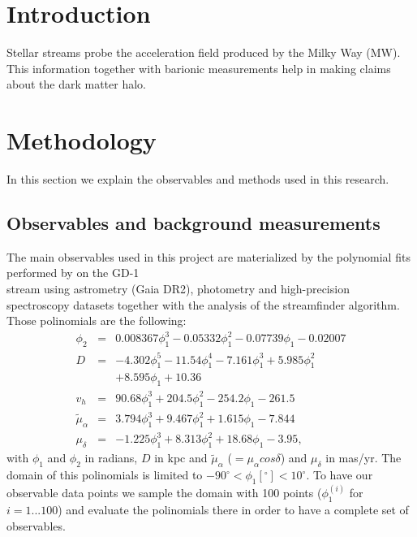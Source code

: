 \documentclass[twocolumn]{aa}
\begin{document}
   \maketitle



\section{Introduction}

Stellar streams probe the acceleration field produced by the Milky Way (MW).
This information together with barionic measurements help in making claims about the
dark matter halo.

\section{Methodology}
In this section we explain the observables and methods used in this research.

\subsection{Observables and background measurements}
The main observables used in this project are materialized by the polynomial fits performed by
\citet{Ibata_2020} on the GD-1\\ stream using astrometry (Gaia DR2), photometry and high-precision spectroscopy datasets together with the analysis of the {\sc streamfinder} algorithm.
Those polinomials are the following:
\begin{eqnarray}
   \label{Ibata_polyn}
   \phi_2  &=& 0.008367\phi_1^3-0.05332\phi_1^2-0.07739\phi_1-0.02007 \\
   D &=& -4.302\phi_1^5-11.54\phi_1^4-7.161\phi_1^3 +5.985\phi_1^2 \nonumber\\
      &&+ 8.595\phi_1+10.36\\
   v_h &=&  90.68\phi_1^3+204.5\phi_1^2-254.2\phi_1-261.5\\
   \tilde{\mu}_\alpha &=& 3.794\phi_1^3+9.467\phi_1^2+1.615\phi_1-7.844\\
   \mu_\delta &=& -1.225\phi_1^3+8.313\phi_1^2+18.68\phi_1-3.95,
   \label{Ibata_polynb}
\end{eqnarray}
with $\phi_1$ and $\phi_2$ in radians, $D$ in kpc and $\tilde{\mu}_\alpha$ ($=\mu_\alpha cos \delta$) and $\mu_\delta$ in mas/yr. The domain of this polinomials is limited to $-90^\circ<\phi_1[^\circ]<10^\circ$.
To have our observable data points we sample the domain with 100 points ($\phi_1^(i)$ for $i=1...100$)
and evaluate the polinomials there in order to have a complete set of observables.
\end{document}
